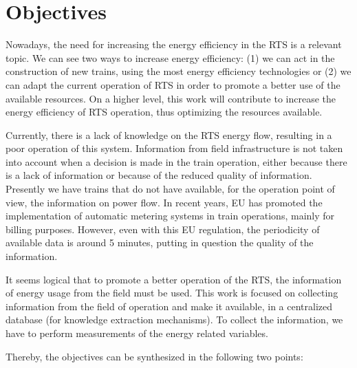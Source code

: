 

\section{Objectives}

Nowadays, the need for increasing the energy efficiency in the \ac{RTS} is a relevant topic.
We can see two ways to increase energy efficiency: (1) we can act in the construction of new trains, using the most energy efficiency technologies or (2) we can adapt the current operation of \ac{RTS} in order to promote a better use of the available resources.
On a higher level, this work will contribute to increase the energy efficiency of \ac{RTS} operation, thus optimizing the resources available.

Currently, there is a lack of knowledge on the \ac{RTS} energy flow, resulting in a poor operation of this system. 
Information from field infrastructure is not taken into account when a decision is made in the train operation, either because there is a lack of information or because of the reduced quality of information.
 Presently we have trains that do not have available, for the operation point of view, the information on power flow. In recent years, \ac{EU} has promoted the implementation of automatic metering systems in train operations, mainly for billing purposes. However, even with this \ac{EU} regulation, the periodicity of available data is around 5 minutes, putting in question the quality of the information.

It seems logical that to promote a better operation of the \ac{RTS}, the information of energy usage from the field must be used.
This work is focused on collecting information from the field of operation and make it available, in a centralized database (for knowledge extraction mechanisms). 
To collect the information, we have to perform measurements of the energy related variables.

Thereby, the objectives can be synthesized in the following two points:

